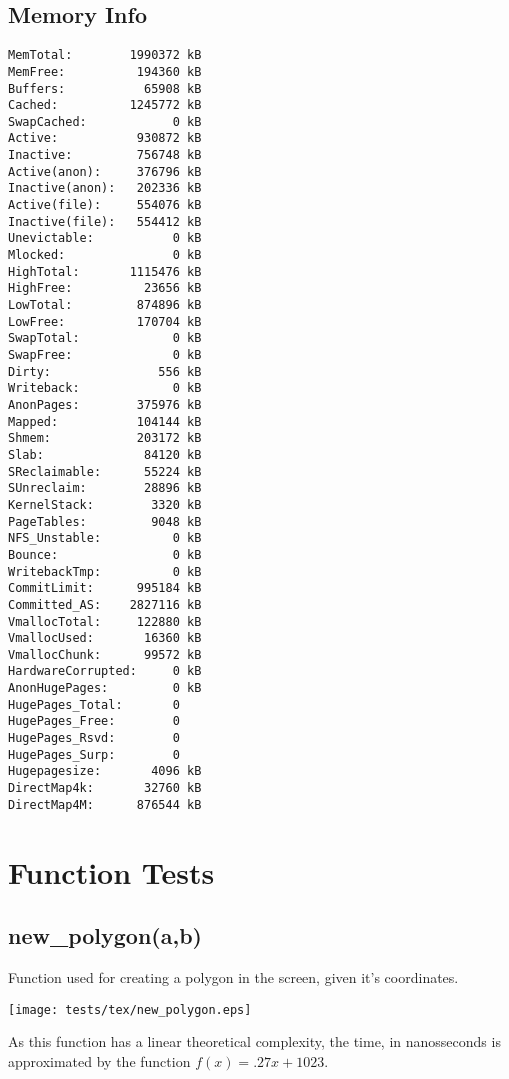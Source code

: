 \documentclass{article}
\begin{document}
\subsection{Memory Info}
\begin{verbatim}
MemTotal:        1990372 kB
MemFree:          194360 kB
Buffers:           65908 kB
Cached:          1245772 kB
SwapCached:            0 kB
Active:           930872 kB
Inactive:         756748 kB
Active(anon):     376796 kB
Inactive(anon):   202336 kB
Active(file):     554076 kB
Inactive(file):   554412 kB
Unevictable:           0 kB
Mlocked:               0 kB
HighTotal:       1115476 kB
HighFree:          23656 kB
LowTotal:         874896 kB
LowFree:          170704 kB
SwapTotal:             0 kB
SwapFree:              0 kB
Dirty:               556 kB
Writeback:             0 kB
AnonPages:        375976 kB
Mapped:           104144 kB
Shmem:            203172 kB
Slab:              84120 kB
SReclaimable:      55224 kB
SUnreclaim:        28896 kB
KernelStack:        3320 kB
PageTables:         9048 kB
NFS_Unstable:          0 kB
Bounce:                0 kB
WritebackTmp:          0 kB
CommitLimit:      995184 kB
Committed_AS:    2827116 kB
VmallocTotal:     122880 kB
VmallocUsed:       16360 kB
VmallocChunk:      99572 kB
HardwareCorrupted:     0 kB
AnonHugePages:         0 kB
HugePages_Total:       0
HugePages_Free:        0
HugePages_Rsvd:        0
HugePages_Surp:        0
Hugepagesize:       4096 kB
DirectMap4k:       32760 kB
DirectMap4M:      876544 kB
\end{verbatim}
\section{Function Tests}
\subsection{new\_polygon(a,b)}
Function used for creating a polygon in the
screen, given it's coordinates. 

\texttt{[image: tests/tex/new\_polygon.eps]}

As this function has a linear theoretical
complexity, the time, in nanosseconds is 
approximated by the function $f(x)=.27x+1023$.
\end{document}
